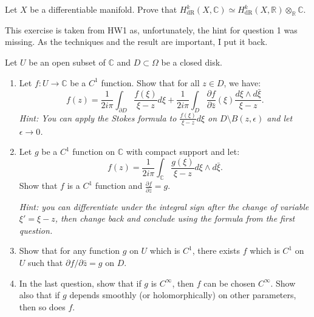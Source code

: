\documentclass[12pt]{article}
\begin{document}



\begin{problab}{1}
Let $X$ be a differentiable manifold. Prove that $H^k_{\text{dR}}(X,\mathbb{C}) \simeq H^k_{\text{dR}}(X,\mathbb{R}) \otimes_{\mathbb{R}} \mathbb{C}$.
\end{problab}
\begin{solu}

\end{solu}
\newpage

\begin{problab}{2}
This exercise is taken from HW1 as, unfortunately, the hint for question 1 was missing. As the techniques and the result are important, I put it back.

Let $U$ be an open subset of $\mathbb{C}$ and $D \subset \Omega$ be a closed disk.

\begin{enumerate}
    \item Let $f : U \to \mathbb{C}$ be a $C^1$ function. Show that for all $z \in D$, we have:
    \[
    f(z) = \frac{1}{2i\pi} \int_{\partial D} \frac{f(\xi)}{\xi - z} d\xi + \frac{1}{2i\pi} \int_D \frac{\partial f}{\partial \bar{z}}(\xi) \frac{d\xi \wedge d\bar{\xi}}{\xi - z}.
    \]
    \textit{Hint: You can apply the Stokes formula to $\frac{f(\xi)}{\xi-z} d\xi$ on $D \setminus B(z, \epsilon)$ and let $\epsilon \to 0$.}

    \item Let $g$ be a $C^1$ function on $\mathbb{C}$ with compact support and let:
    \[
    f(z) = \frac{1}{2i\pi} \int_{\mathbb{C}} \frac{g(\xi)}{\xi - z} d\xi \wedge d\bar{\xi}.
    \]
    Show that $f$ is a $C^1$ function and $\frac{\partial f}{\partial \bar{z}} = g$.

    \textit{Hint: you can differentiate under the integral sign after the change of variable $\xi' = \xi - z$, then change back and conclude using the formula from the first question.}

    \item Show that for any function $g$ on $U$ which is $C^1$, there exists $f$ which is $C^1$ on $U$ such that $\partial f/\partial \bar{z} = g$ on $D$.

    \item In the last question, show that if $g$ is $C^\infty$, then $f$ can be chosen $C^\infty$. Show also that if $g$ depends smoothly (or holomorphically) on other parameters, then so does $f$.
\end{enumerate}
\end{problab}
\begin{solu}

\end{solu}
\newpage
\end{document}
